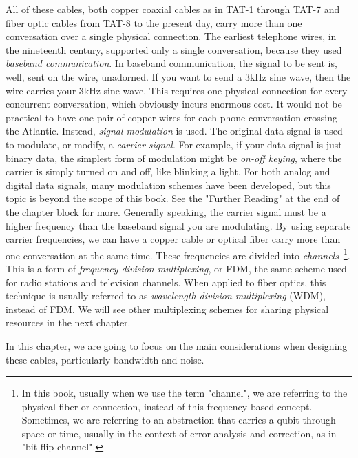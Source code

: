 All of these cables, both copper coaxial cables as in TAT-1 through TAT-7 and fiber optic cables from TAT-8 to the present day, carry more than one conversation over a single physical connection.  The earliest telephone wires, in the nineteenth century, supported only a single conversation, because they used \emph{baseband communication}. In baseband communication, the signal to be sent is, well, sent on the wire, unadorned.  If you want to send a 3kHz sine wave, then the wire carries your 3kHz sine wave. This requires one physical connection for every concurrent conversation, which obviously incurs enormous cost.  It would not be practical to have one pair of copper wires for each phone conversation crossing the Atlantic.  Instead, \emph{signal modulation} is used.  The original data signal is used to modulate, or modify, a \emph{carrier signal}. For example, if your data signal is just binary data, the simplest form of modulation might be \emph{on-off keying}, where the carrier is simply turned on and off, like blinking a light. For both analog and digital data signals, many modulation schemes have been developed, but this topic is beyond the scope of this book. See the "Further Reading" at the end of the chapter block for more.  Generally speaking, the carrier signal must be a higher frequency than the baseband signal you are modulating. By using separate carrier frequencies, we can have a copper cable or optical fiber carry more than one conversation at the same time. These frequencies are divided into \emph{channels}~\footnote{In this book, usually when we use the term "channel", we are referring to the physical fiber or connection, instead of this frequency-based concept.  Sometimes, we are referring to an abstraction that carries a qubit through space or time, usually in the context of error analysis and correction, as in "bit flip channel".}.  This is a form of \emph{frequency division multiplexing}, or FDM, the same scheme used for radio stations and television channels. When applied to fiber optics, this technique is usually referred to as \emph{wavelength division multiplexing} (WDM), instead of FDM.  We will see other multiplexing schemes for sharing physical resources in the next chapter.

In this chapter, we are going to focus on the main considerations when designing these cables, particularly bandwidth and noise.

